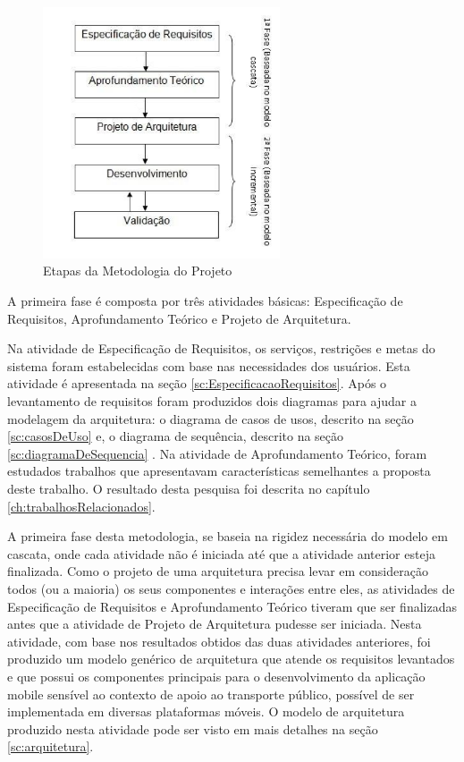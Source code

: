 \begin{figure}[htp]
\begin{center}
  \includegraphics[width=7cm]{images/metodologia.png}
  \caption{Etapas da Metodologia do Projeto}
  \label{fig:exampleMetodologia}
\end{center}
\end{figure}

A primeira fase é composta por três atividades básicas: Especificação de Requisitos, Aprofundamento Teórico e Projeto de Arquitetura.

Na atividade de Especificação de Requisitos, os serviços, restrições e metas do sistema foram estabelecidas com base nas necessidades dos usuários. Esta atividade é apresentada na seção \ref{sc:EspecificacaoRequisitos}. Após o levantamento de requisitos foram produzidos dois diagramas para ajudar a modelagem da arquitetura: o diagrama de casos de usos, descrito na seção \ref{sc:casosDeUso} e, o diagrama de sequência, descrito na seção \ref{sc:diagramaDeSequencia} . Na atividade de Aprofundamento Teórico, foram estudados trabalhos que apresentavam características semelhantes a proposta deste trabalho. O resultado desta pesquisa foi descrita no capítulo \ref{ch:trabalhosRelacionados}.

A primeira fase desta metodologia, se baseia na rigidez necessária do modelo em cascata, onde cada atividade não é iniciada até que a atividade anterior esteja finalizada. Como o projeto de uma arquitetura precisa levar em consideração todos (ou a maioria) os seus componentes e interações entre eles, as atividades de Especificação de Requisitos e Aprofundamento Teórico tiveram que ser finalizadas antes que a atividade de Projeto de Arquitetura pudesse ser iniciada. Nesta atividade, com base nos resultados obtidos das duas atividades anteriores, foi produzido um modelo genérico de arquitetura que atende os requisitos levantados e que possui os componentes principais para o desenvolvimento da aplicação mobile sensível ao contexto de apoio ao transporte público, possível de ser implementada em diversas plataformas móveis. O modelo de arquitetura produzido nesta atividade pode ser visto em mais detalhes na seção \ref{sc:arquitetura}.

